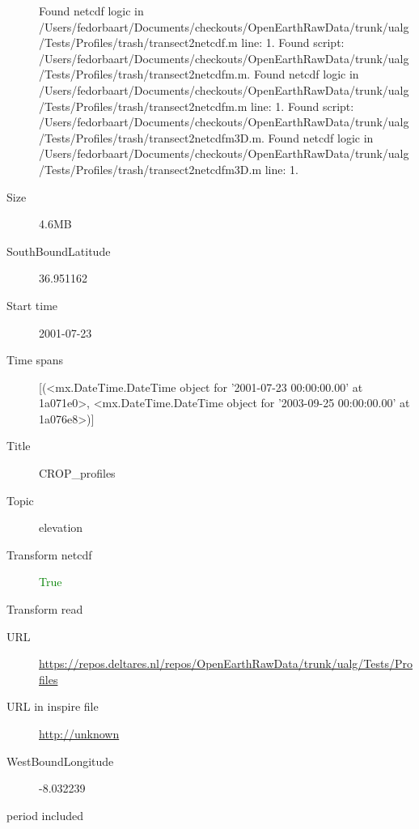 \documentclass[9]{report}
\begin{document}
\begin{description}
Found netcdf logic in /Users/fedorbaart/Documents/checkouts/OpenEarthRawData/trunk/ualg/Tests/Profiles/trash/transect2netcdf.m line: 1.
Found script: /Users/fedorbaart/Documents/checkouts/OpenEarthRawData/trunk/ualg/Tests/Profiles/trash/transect2netcdfm.m.
Found netcdf logic in /Users/fedorbaart/Documents/checkouts/OpenEarthRawData/trunk/ualg/Tests/Profiles/trash/transect2netcdfm.m line: 1.
Found script: /Users/fedorbaart/Documents/checkouts/OpenEarthRawData/trunk/ualg/Tests/Profiles/trash/transect2netcdfm3D.m.
Found netcdf logic in /Users/fedorbaart/Documents/checkouts/OpenEarthRawData/trunk/ualg/Tests/Profiles/trash/transect2netcdfm3D.m line: 1.
  \item[Size] 4.6MB
  \item[SouthBoundLatitude] 36.951162
  \item[Start time] 2001-07-23
  \item[Time spans] [(<mx.DateTime.DateTime object for '2001-07-23 00:00:00.00' at 1a071e0>, <mx.DateTime.DateTime object for '2003-09-25 00:00:00.00' at 1a076e8>)]
  \item[Title]  CROP\_profiles 
  \item[Topic] elevation
  \item[Transform netcdf] \textcolor{green}{True}
  \item[Transform read] \textcolor{blue}{}
  \item[URL] \href{https://repos.deltares.nl/repos/OpenEarthRawData/trunk/ualg/Tests/Profiles}{https://repos.deltares.nl/repos/OpenEarthRawData/trunk/ualg/Tests/Profiles}
  \item[URL in inspire file] \href{http://unknown}{http://unknown}
  \item[WestBoundLongitude] -8.032239
  \item[period included] 
\end{description}
\end{document}

